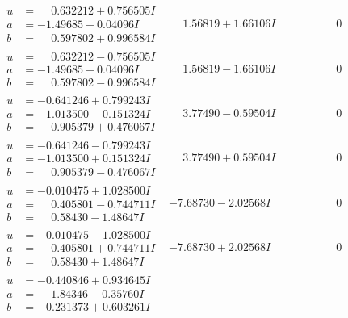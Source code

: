 \documentclass[1p]{elsarticle_modified}
\theoremstyle{definition}
\begin{document}
$$\begin{array}{c|c|c}
\begin{aligned}
u &= \phantom{-}0.632212 + 0.756505 I \\
a &= -1.49685 + 0.04096 I \\
b &= \phantom{-}0.597802 + 0.996584 I\end{aligned}
 & \phantom{-}1.56819 + 1.66106 I & \phantom{-0.000000 } 0 \\ \hline\begin{aligned}
u &= \phantom{-}0.632212 - 0.756505 I \\
a &= -1.49685 - 0.04096 I \\
b &= \phantom{-}0.597802 - 0.996584 I\end{aligned}
 & \phantom{-}1.56819 - 1.66106 I & \phantom{-0.000000 } 0 \\ \hline\begin{aligned}
u &= -0.641246 + 0.799243 I \\
a &= -1.013500 - 0.151324 I \\
b &= \phantom{-}0.905379 + 0.476067 I\end{aligned}
 & \phantom{-}3.77490 - 0.59504 I & \phantom{-0.000000 } 0 \\ \hline\begin{aligned}
u &= -0.641246 - 0.799243 I \\
a &= -1.013500 + 0.151324 I \\
b &= \phantom{-}0.905379 - 0.476067 I\end{aligned}
 & \phantom{-}3.77490 + 0.59504 I & \phantom{-0.000000 } 0 \\ \hline\begin{aligned}
u &= -0.010475 + 1.028500 I \\
a &= \phantom{-}0.405801 - 0.744711 I \\
b &= \phantom{-}0.58430 - 1.48647 I\end{aligned}
 & -7.68730 - 2.02568 I & \phantom{-0.000000 } 0 \\ \hline\begin{aligned}
u &= -0.010475 - 1.028500 I \\
a &= \phantom{-}0.405801 + 0.744711 I \\
b &= \phantom{-}0.58430 + 1.48647 I\end{aligned}
 & -7.68730 + 2.02568 I & \phantom{-0.000000 } 0 \\ \hline\begin{aligned}
u &= -0.440846 + 0.934645 I \\
a &= \phantom{-}1.84346 - 0.35760 I \\
b &= -0.231373 + 0.603261 I\end{aligned}

\end{array}$$
\end{document}
